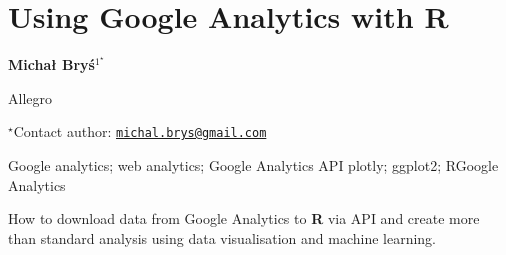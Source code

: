 \documentclass[\main/boa.tex]{subfiles}
\begin{document}
\section{Using Google Analytics with R}

\begin{center}
  {\bf Michał Bryś$^{1^\star}$}
\end{center}

\vskip 0.3cm

\begin{affiliations}
\begin{enumerate}
\begin{minipage}{0.915\textwidth}
\centering
\item Allegro \\[-2pt]
\end{minipage}
\end{enumerate}
$^\star$Contact author: \href{mailto:michal.brys@gmail.com}{\nolinkurl{michal.brys@gmail.com}}\\
\end{affiliations}

\vskip 0.5cm

\begin{minipage}{0.915\textwidth}
\keywords Google analytics; web analytics; Google Analytics API
\packages plotly; ggplot2; RGoogle Analytics
\end{minipage}

\vskip 0.8cm

How to download data from Google Analytics to \textbf{R} via API and
create more than standard analysis using data visualisation and machine
learning.
\end{document}
